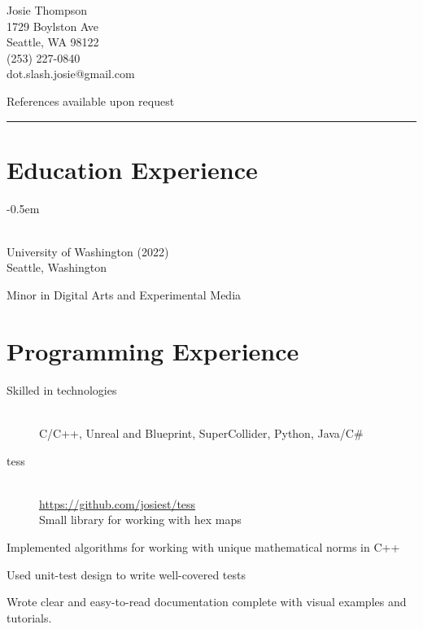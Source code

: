 \documentclass[10pt]{article}
\newenvironment{itemize*}
{\begin{itemize}[leftmargin=*]
    \setlength{\parskip}{0.5pt}}
{\end{itemize}}
\begin{document}
\noindent
\parbox[t]{0.5\textwidth}{
    {\sffamily\Huge Josie Thompson}\medskip\\
    1729 Boylston Ave\\
    Seattle, WA 98122\\
    (253) 227-0840\\
    dot.slash.josie@gmail.com

    References available upon request
}
\vspace{12pt}
\hrule


\begin{paracol}{2}
\section*{Education Experience}
\begin{description}
\itemsep -0.5em
\item[B.S. in Computer Science] \hfill \\
    University of Washington (2022)\\
    Seattle, Washington

    Minor in Digital Arts and Experimental Media
\end{description}

\section*{Programming Experience}
\begin{description}
\item[Skilled in technologies] \hfill \\
C/C++, Unreal and Blueprint, SuperCollider, Python, Java/C\#
\end{description}

\begin{description}
\item[tess] \hfill \\
    \url{https://github.com/josiest/tess}\\
    Small library for working with hex maps
\end{description}
\begin{itemize*}
\item Implemented algorithms for working with unique mathematical norms in C++
\item Used unit-test design to write well-covered tests
\item Wrote clear and easy-to-read documentation complete with visual examples
      and tutorials.
\end{itemize*}


\end{paracol}
\end{document}
